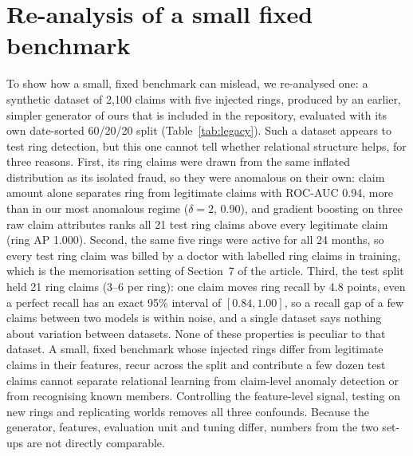 \documentclass[pdflatex,sn-vancouver-num]{sn-jnl}
\newcommand{\MainSecMechanism}{7}
\begin{document}
\section{Re-analysis of a small fixed benchmark}\label{sec:legacy}
To show how a small, fixed benchmark can mislead, we re-analysed one: a
synthetic dataset of 2{,}100 claims with five injected rings, produced by an
earlier, simpler generator of ours that is included in the repository,
evaluated with its own
date-sorted 60/20/20 split (Table~\ref{tab:legacy}). Such a dataset appears
to test ring detection, but this one cannot tell whether relational
structure helps, for three reasons. First, its ring claims were drawn from the
same inflated distribution as its isolated fraud, so they were anomalous on
their own: claim amount alone separates ring from legitimate claims with
ROC-AUC 0.94, more than in our most anomalous regime ($\delta=2$, 0.90), and
gradient boosting on three raw claim attributes ranks all 21 test ring claims
above every legitimate claim (ring AP 1.000). Second, the same five rings
were active for all 24 months, so every test ring claim was billed by a
doctor with labelled ring claims in training, which is the memorisation
setting of Section~\MainSecMechanism{} of the article. Third, the test split held 21 ring
claims (3--6 per ring): one claim moves ring recall by 4.8 points, even a
perfect recall has an exact 95\% interval of $[0.84, 1.00]$, so a recall gap
of a few claims between two models is within noise, and a single dataset says
nothing about variation between datasets. None of these properties is
peculiar to that dataset. A small, fixed benchmark whose injected rings
differ from legitimate claims in their features, recur across the split and
contribute a few dozen test claims cannot separate relational learning from
claim-level anomaly detection or from recognising known members. Controlling
the feature-level signal, testing on new rings and replicating worlds
removes all three confounds. Because the generator, features, evaluation unit
and tuning differ, numbers from the two set-ups are not directly comparable.
\end{document}
